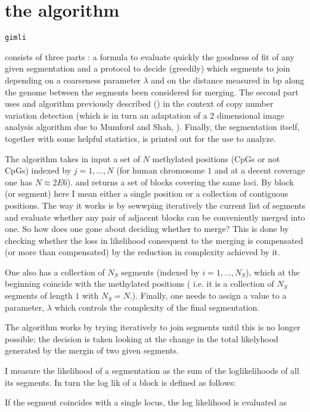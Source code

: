 \documentclass[11pt]{amsart}
\newcommand{\gimli}{\begin{verbatim}gimli\end{verbatim}}
\begin{document}
\section{the algorithm}

\gimli consists of three parts : a formula to evaluate quickly the 
goodness of fit of any given segmentation
and a protocol to decide (greedily) which  segments to join depending 
on a coarseness parameter $\lambda$ and on the distance measured in bp along
the genome between the segments been considered for merging. 
The second part uses and  algorithm previously described   (\cite{vega}) in 
the context of copy number variation detection (which is in turn an adaptation 
of a 2 dimensional image analysis algorithm due to Mumford and Shah, 
\cite{mumfordshah}). Finally, the segmentation itself, together with some 
helpful statistics, is printed out for the use to analyze.

The algorithm takes in input a set of $N$ methylated positions 
(CpGs or not CpGs) indexed by $j=1,\dots,N$ 
(for human chromosome $1$ and at a 
decent coverage one has $N \approx 2E6$).
and returns a set of blocks covering the same loci.
By block (or segment) here I mean either a single position or a collection
of contiguous positions. The way it works is by sewwping
iteratively the current list of segments and evaluate whether any pair 
of adjacent blocks can be conveniently merged into one. So how does one gone about
deciding whether to merge? This is  done by checking whether the loss in 
likelihood consequent to the merging is compensated (or more than compensated)
by the reduction in complexity achieved by it.

One also has a collection of $N_S$ 
segments (indexed by $i=1,\dots,N_S$), 
which at the beginning
coincide with the methylated positions ( i.e. it is a collection of $N_S$ 
segments of length $1$ with $N_S=N$.).
Finally, one needs to assign a value to a parameter, $\lambda$ which controls the 
complexity of the final segmentation.

The algorithm works by trying iteratively to join segments until this
is no longer possible; the decision is taken looking at the change
in the total likelyhood generated by the mergin of two given segments. 

I measure the likelihood of a segmentation as the sum of the loglikelihoods
of all its segments. In turn the log lik of a block is defined as follows:

If the
segment coincides with a single locus, 
the log likelihood  is evaluated as 
\end{document}
